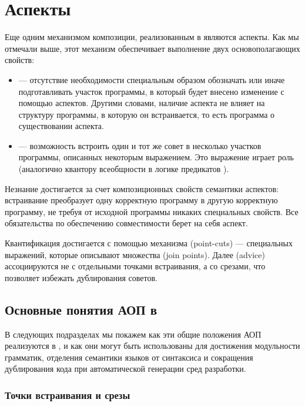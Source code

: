 \chapter{Аспекты}%
%
Еще одним механизмом композиции, реализованным в  являются аспекты. Как мы отмечали выше, этот механизм обеспечивает выполнение двух основополагающих свойств:
\begin{itemize}
\item {} --- отсутствие необходимости специальным образом обозначать или иначе подготавливать участок программы, в который будет внесено изменение с помощью аспектов. Другими словами, наличие аспекта не влияет на структуру программы, в которую он встраивается, то есть программа  о существовании аспекта.
\item {} --- возможность встроить один и тот же совет в несколько участков программы, описанных некоторым выражением. Это выражение играет роль  (аналогично квантору всеобщности в логике предикатов \cite{???}).
\end{itemize}

Незнание достигается за счет композиционных свойств семантики аспектов: встраивание преобразует одну корректную программу в другую корректную программу, не требуя от исходной программы никаких специальных свойств. Все обязательства по обеспечению совместимости берет на себя аспект.

Квантификация достигается с помощью механизма  (point-cuts) --- специальных выражений, которые описывают множества  (join points). Далее  (advice) ассоциируются не с отдельными точками встраивания, а со срезами, что позволяет избежать дублирования советов.

\section{Основные понятия АОП в }

В следующих подразделах мы покажем как эти общие положения АОП реализуются в , и как они могут быть использованы для достижения модульности грамматик, отделения семантики языков от синтаксиса и сокращения дублирования кода при автоматической генерации сред разработки.

\subsection{Точки встраивания и срезы}

